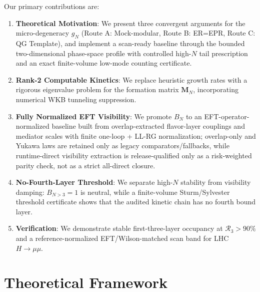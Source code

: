 \documentclass[aps,prd,onecolumn,notitlepage,nofootinbib,superscriptaddress,11pt,floatfix]{revtex4-2}
\begin{document}
Our primary contributions are:
\begin{enumerate}
    \item \textbf{Theoretical Motivation}: We present three convergent arguments for the micro-degeneracy $g_N$ (Route A: Mock-modular, Route B: ER=EPR, Route C: QG Template), and implement a scan-ready baseline through the bounded two-dimensional phase-space profile with controlled high-$N$ tail prescription and an exact finite-volume low-mode counting certificate.
    \item \textbf{Rank-2 Computable Kinetics}: We replace heuristic growth rates with a rigorous eigenvalue problem for the formation matrix $\mathbf{M}_N$, incorporating numerical WKB tunneling suppression.
    \item \textbf{Fully Normalized EFT Visibility}: We promote $B_N$ to an EFT-operator-normalized baseline built from overlap-extracted flavor-layer couplings and mediator scales with finite one-loop + LL-RG normalization; overlap-only and Yukawa laws are retained only as legacy comparators/fallbacks, while runtime-direct visibility extraction is release-qualified only as a risk-weighted parity check, not as a strict all-direct closure.
    \item \textbf{No-Fourth-Layer Threshold}: We separate high-$N$ stability from visibility damping: \(B_{N>3}=1\) is neutral, while a finite-volume Sturm/Sylvester threshold certificate shows that the audited kinetic chain has no fourth bound layer.
    \item \textbf{Verification}: We demonstrate stable first-three-layer occupancy at $\mathcal{R}_3>90\%$ and a reference-normalized EFT/Wilson-matched scan band for LHC $H\to\mu\mu$.
\end{enumerate}

\section{Theoretical Framework}
\label{sec:theory}
\end{document}
